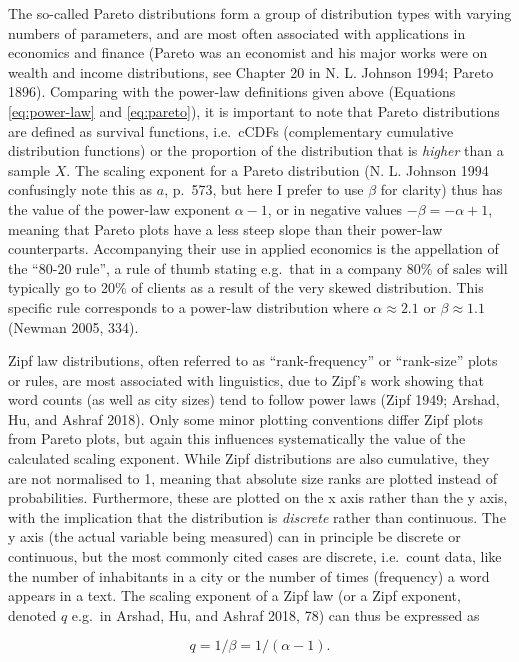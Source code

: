 \documentclass[
  12pt,
  a4paper, twoside]{book}
\begin{document}
The so-called Pareto distributions form a group of distribution types with varying numbers of parameters, and are most often associated with applications in economics and finance (Pareto was an economist and his major works were on wealth and income distributions, see Chapter 20 in N. L. Johnson 1994; Pareto 1896). Comparing with the power-law definitions given above (Equations \eqref{eq:power-law} and \eqref{eq:pareto}), it is important to note that Pareto distributions are defined as survival functions, i.e.~cCDFs (complementary cumulative distribution functions) or the proportion of the distribution that is \emph{higher} than a sample \(X\). The scaling exponent for a Pareto distribution (N. L. Johnson 1994 confusingly note this as \(a\), p.~573, but here I prefer to use \(\beta\) for clarity) thus has the value of the power-law exponent \(\alpha-1\), or in negative values \(-\beta = -\alpha +1\), meaning that Pareto plots have a less steep slope than their power-law counterparts. Accompanying their use in applied economics is the appellation of the ``80-20 rule'', a rule of thumb stating e.g.~that in a company 80\% of sales will typically go to 20\% of clients as a result of the very skewed distribution. This specific rule corresponds to a power-law distribution where \(\alpha \approx 2.1\) or \(\beta \approx 1.1\) (Newman 2005, 334).

Zipf law distributions, often referred to as ``rank-frequency'' or ``rank-size'' plots or rules, are most associated with linguistics, due to Zipf's work showing that word counts (as well as city sizes) tend to follow power laws (Zipf 1949; Arshad, Hu, and Ashraf 2018). Only some minor plotting conventions differ Zipf plots from Pareto plots, but again this influences systematically the value of the calculated scaling exponent. While Zipf distributions are also cumulative, they are not normalised to 1, meaning that absolute size ranks are plotted instead of probabilities. Furthermore, these are plotted on the x axis rather than the y axis, with the implication that the distribution is \emph{discrete} rather than continuous. The y axis (the actual variable being measured) can in principle be discrete or continuous, but the most commonly cited cases are discrete, i.e.~count data, like the number of inhabitants in a city or the number of times (frequency) a word appears in a text. The scaling exponent of a Zipf law (or a Zipf exponent, denoted \(q\) e.g.~in Arshad, Hu, and Ashraf 2018, 78) can thus be expressed as

\begin{equation}
q = 1/\beta = 1/(\alpha-1).
\label{eq:zipf-exponent}
\end{equation}
\end{document}
